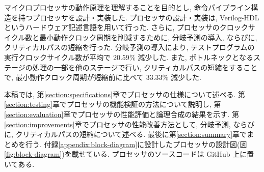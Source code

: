 \documentclass[../main.tex]{subfiles}
\begin{document}
  マイクロプロセッサの動作原理を理解することを目的とし, 
  命令パイプライン構造を持つプロセッサを設計・実装した.
  プロセッサの設計・実装は, Verilog-HDL というハードウェア記述言語を用いて行った.
  さらに, プロセッサのクロックサイクル数と最小動作クロック周期を削減するために, 
  分岐予測の導入, ならびに, クリティカルパスの短縮を行った.
  分岐予測の導入により, テストプログラムの実行クロックサイクル数が平均で $20.59\%$ 減少した.
  また, ボトルネックとなるステージの処理の一部を他のステージで行い, 
  クリティカルパスの短縮をすることで, 
  最小動作クロック周期が短縮前に比べて $33.33\%$ 減少した.

  本稿では, 第\ref{section:specifications}章でプロセッサの仕様について述べる.
  第\ref{section:testing}章でプロセッサの機能検証の方法について説明し, 
  第\ref{section:evaluation}章でプロセッサの性能評価と論理合成の結果を示す.
  第\ref{section:improvements}章でプロセッサの性能改善方法として, 分岐予測, ならびに, クリティカルパスの短縮について述べる.
  最後に第\ref{section:summary}章でまとめを行う.
  付録\ref{appendix:block-diagram}に設計したプロセッサの設計図(図\ref{fig:block-diagram})を載せている.
  プロセッサのソースコードは GitHub \footnotemark 上に置いてある.
\end{document}
